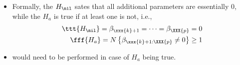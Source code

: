 \begin{itemize}
\begin{itemize}
\begin{itemize}
        \end{itemize}
      \item Formally, the \(H_\nil\) sates that all additional parameters are essentially 0, while the \(H_a\) is true if at least one is not, i.e.,
      \begin{align*}
        \ttt{H_\nil} = \beta_{\xxx{k}+1} = \cdots = \beta_\XXX{p} = 0 \\
        \fff{H_a} = N\left\{\beta_{\xxx{k}+1:\XXX{p}} \neq 0\right\} \geq 1
      \end{align*}
      \item \hyperref[Subsection: Post Hoc Comparisons]{} would need to be performed in case of \(H_a\) being true.
    \end{itemize}
\end{itemize}
